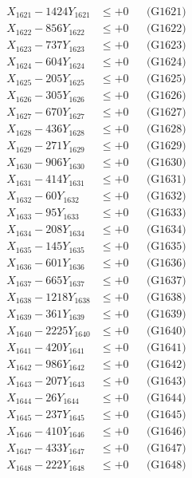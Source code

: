 \documentclass[a4paper,10pt]{article}
\begin{document}
{\begin{align}
\allowbreak
X_{1621} - 1424Y_{1621} &\leq +0 && \text{(G1621)} \\
X_{1622} - 856Y_{1622} &\leq +0 && \text{(G1622)} \\
X_{1623} - 737Y_{1623} &\leq +0 && \text{(G1623)} \\
X_{1624} - 604Y_{1624} &\leq +0 && \text{(G1624)} \\
X_{1625} - 205Y_{1625} &\leq +0 && \text{(G1625)} \\
X_{1626} - 305Y_{1626} &\leq +0 && \text{(G1626)} \\
X_{1627} - 670Y_{1627} &\leq +0 && \text{(G1627)} \\
X_{1628} - 436Y_{1628} &\leq +0 && \text{(G1628)} \\
X_{1629} - 271Y_{1629} &\leq +0 && \text{(G1629)} \\
X_{1630} - 906Y_{1630} &\leq +0 && \text{(G1630)} \\
\allowbreak
X_{1631} - 414Y_{1631} &\leq +0 && \text{(G1631)} \\
X_{1632} - 60Y_{1632} &\leq +0 && \text{(G1632)} \\
X_{1633} - 95Y_{1633} &\leq +0 && \text{(G1633)} \\
X_{1634} - 208Y_{1634} &\leq +0 && \text{(G1634)} \\
X_{1635} - 145Y_{1635} &\leq +0 && \text{(G1635)} \\
X_{1636} - 601Y_{1636} &\leq +0 && \text{(G1636)} \\
X_{1637} - 665Y_{1637} &\leq +0 && \text{(G1637)} \\
X_{1638} - 1218Y_{1638} &\leq +0 && \text{(G1638)} \\
X_{1639} - 361Y_{1639} &\leq +0 && \text{(G1639)} \\
X_{1640} - 2225Y_{1640} &\leq +0 && \text{(G1640)} \\
\allowbreak
X_{1641} - 420Y_{1641} &\leq +0 && \text{(G1641)} \\
X_{1642} - 986Y_{1642} &\leq +0 && \text{(G1642)} \\
X_{1643} - 207Y_{1643} &\leq +0 && \text{(G1643)} \\
X_{1644} - 26Y_{1644} &\leq +0 && \text{(G1644)} \\
X_{1645} - 237Y_{1645} &\leq +0 && \text{(G1645)} \\
X_{1646} - 410Y_{1646} &\leq +0 && \text{(G1646)} \\
X_{1647} - 433Y_{1647} &\leq +0 && \text{(G1647)} \\
X_{1648} - 222Y_{1648} &\leq +0 && \text{(G1648)} \\

\end{align}}
\end{document}
